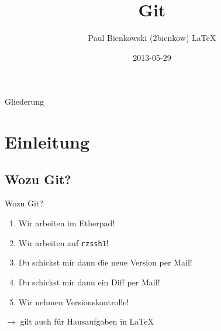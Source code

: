 \documentclass[compress,t]{beamer}
\title{Git}
\author{Paul Bienkowski (2bienkow)  \LaTeX}
\institute{KunterBuntesSeminar}
\date{2013-05-29}
\begin{document}
\frame{
    \titlepage
}

\begin{frame}{Gliederung}
    \tableofcontents
\end{frame}

\section{Einleitung}
\subsection{Wozu Git?}

\begin{frame}{Wozu Git?}

    \begin{enumerate}
        \item<3-> Wir arbeiten im Etherpad!
        \item<4-> Wir arbeiten auf \texttt{rzssh1}!
        \item<5-> Du schickst mir dann die neue Version per Mail!
        \item<6-> Du schickst mir dann ein Diff per Mail!
        \item<7-> Wir nehmen Versionskontrolle!
    \end{enumerate}

     {
        $\rightarrow$ gilt auch für Hausaufgaben in \LaTeX
    }

    \vspace{0.2cm}


\end{frame}
\end{document}
